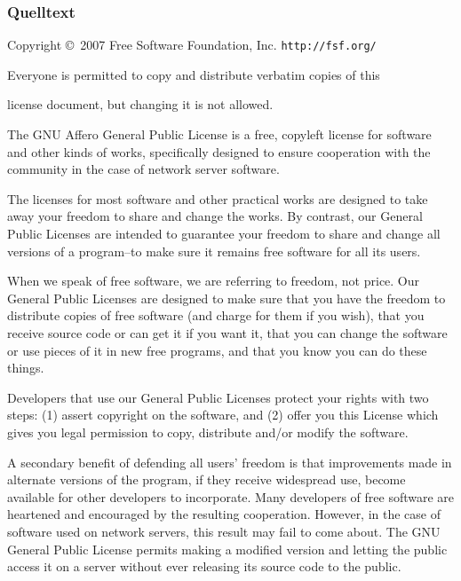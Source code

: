 \documentclass[10pt,a4paper,ngerman,titlepage,tocindentauto]{article}
\begin{document}
			\subsubsection{Quelltext}
			\begin{multicols}{3}
				{\tiny
					\begin{center}
						{\parindent 0in

						Copyright \copyright\  2007 Free Software Foundation, Inc. \texttt{http://fsf.org/}

						\bigskip
						Everyone is permitted to copy and distribute verbatim copies of this

						license document, but changing it is not allowed.}

						\end{center}

						\renewcommand{\abstractname}{Preamble}
						The GNU Affero General Public License is a free, copyleft license
						for software and other kinds of works, specifically designed to ensure
						cooperation with the community in the case of network server software.

						The licenses for most software and other practical works are
						designed to take away your freedom to share and change the works.  By
						contrast, our General Public Licenses are intended to guarantee your
						freedom to share and change all versions of a program--to make sure it
						remains free software for all its users.

						When we speak of free software, we are referring to freedom, not
						price.  Our General Public Licenses are designed to make sure that you
						have the freedom to distribute copies of free software (and charge for
						them if you wish), that you receive source code or can get it if you
						want it, that you can change the software or use pieces of it in new
						free programs, and that you know you can do these things.

						Developers that use our General Public Licenses protect your rights
						with two steps: (1) assert copyright on the software, and (2) offer
						you this License which gives you legal permission to copy, distribute
						and/or modify the software.

						A secondary benefit of defending all users' freedom is that
						improvements made in alternate versions of the program, if they
						receive widespread use, become available for other developers to
						incorporate.  Many developers of free software are heartened and
						encouraged by the resulting cooperation.  However, in the case of
						software used on network servers, this result may fail to come about.
						The GNU General Public License permits making a modified version and
						letting the public access it on a server without ever releasing its
						source code to the public.

}
\end{multicols}
\end{document}
